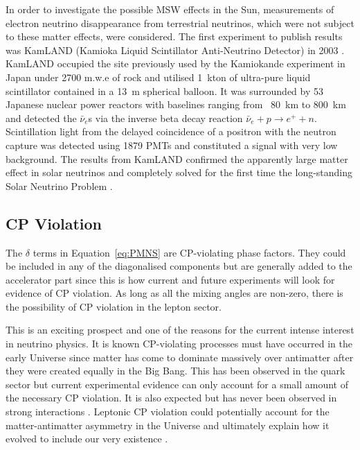 In order to investigate the possible MSW effects in the Sun, measurements of electron neutrino disappearance from terrestrial neutrinos, which were not subject to these matter effects, were considered.  The first experiment to publish results was KamLAND (Kamioka Liquid Scintillator Anti-Neutrino Detector) in 2003 \cite{KamLAND2003,KamLAND2005}.  KamLAND occupied the site previously used by the Kamiokande experiment in Japan under 2700 m.w.e of rock and utilised 1~kton of ultra-pure liquid scintillator contained in a 13~m spherical balloon.  It was surrounded by 53 Japanese nuclear power reactors with baselines ranging from ~80~km to 800~km and detected the $\bar{\nu}_e$s via the inverse beta decay reaction $\bar{\nu}_e + p \rightarrow e^+ + n$.  Scintillation light from the delayed coincidence of a positron with the neutron capture was detected using 1879 PMTs and constituted a signal with very low background.  The results from KamLAND confirmed the apparently large matter effect in solar neutrinos and completely solved for the first time the long-standing Solar Neutrino Problem \cite{Bandyopadhyay2002,deHolanda2002,Fogli2003}.

\subsection{CP Violation}\label{sec:CPViolation}

The $\delta$ terms in Equation~\ref{eq:PMNS} are CP-violating phase factors.  They could be included in any of the diagonalised components but are generally added to the accelerator part since this is how current and future experiments will look for evidence of CP violation.  As long as all the mixing angles are non-zero, there is the possibility of CP violation in the lepton sector.

This is an exciting prospect and one of the reasons for the current intense interest in neutrino physics.  It is known CP-violating processes must have occurred in the early Universe since matter has come to dominate massively over antimatter after they were created equally in the Big Bang.  This has been observed in the quark sector but current experimental evidence can only account for a small amount of the necessary CP violation.  It is also expected but has never been observed in strong interactions \cite{Mannel2007}.  Leptonic CP violation could potentially account for the matter-antimatter asymmetry in the Universe and ultimately explain how it evolved to include our very existence \cite{Ohlsson2012,Ohlsson2013}.

